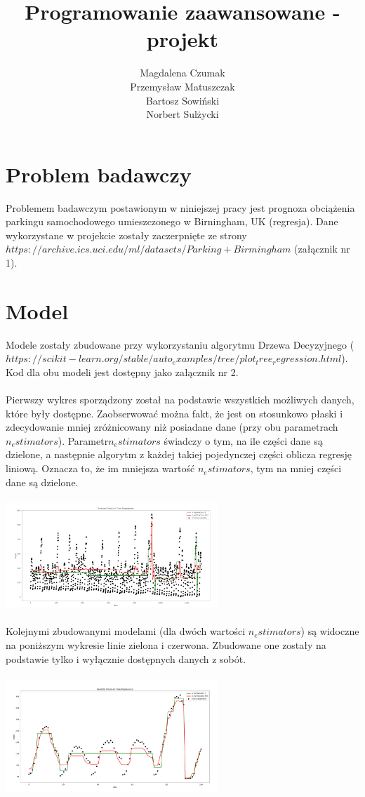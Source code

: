 \documentclass[]{article}
\title{Programowanie zaawansowane - projekt}
\author{Magdalena Czumak \\
Przemysław Matuszczak\\
Bartosz Sowiński\\
Norbert Sulżycki\\
}
\begin{document}
\maketitle



\section{Problem badawczy}
Problemem badawczym postawionym w niniejszej pracy jest prognoza obciążenia parkingu samochodowego umieszczonego w Birningham, UK (regresja). Dane wykorzystane w projekcie zostały zaczerpnięte ze strony\\ $https://archive.ics.uci.edu/ml/datasets/Parking+Birmingham$ (załącznik nr 1).

\section{Model}
Modele zostały zbudowane przy wykorzystaniu algorytmu Drzewa Decyzyjnego ($https://scikit-learn.org/stable/auto_examples/tree/plot_tree_regression.html$). Kod dla obu modeli jest dostępny jako załącznik nr 2.\\
\\
Pierwszy wykres sporządzony został na podstawie wszystkich możliwych danych, które były dostępne. Zaobserwować można fakt, że jest on stosunkowo płaski i zdecydowanie mniej zróżnicowany niż posiadane dane (przy obu parametrach $n_estimators$). Parametr$ n_estimators$ świadczy o tym, na ile części dane są dzielone, a następnie algorytm z każdej takiej pojedynczej części oblicza regresję liniową. Oznacza to, że im mniejsza wartość $n_estimators$, tym na mniej części dane są dzielone.\\
\\
\includegraphics[width=8cm]{image-0}\\
\\
Kolejnymi zbudowanymi modelami (dla dwóch wartości $n_estimators$) są widoczne na poniższym wykresie linie zielona i czerwona. Zbudowane one zostały na podstawie tylko i wyłącznie dostępnych danych z sobót. \\
\\
\includegraphics[width=8cm]{image-1}\\
\\
\end{document}
